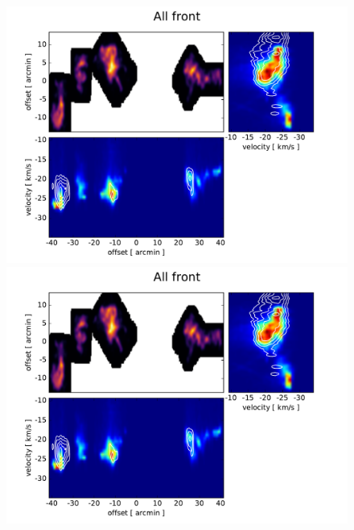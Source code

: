 \documentclass[traditabstract]{aa}
\begin{document}
\begin{figure}[h]
  \centering
  \includegraphics[page=5,width=14cm,trim=30 10 55 30,clip=true]{Figures/PV_diagrams.pdf} \\
  \includegraphics[page=4,width=14cm,trim=30 10 55 30,clip=true]{Figures/PV_diagrams.pdf}
  \caption{}
\end{figure}

\end{document}
